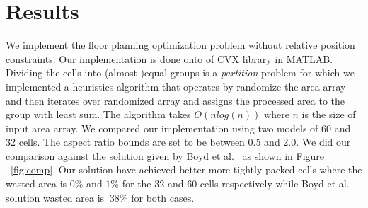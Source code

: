 \documentclass[12pt] {article}
\begin{document}
\section{Results}
We implement the floor planning optimization problem without relative position constraints. Our implementation is done onto of CVX library in MATLAB. Dividing the cells into (almost-)equal groups is a \emph{partition} problem for which we implemented a %
heuristics algorithm that operates by randomize the area array and then iterates over randomized array and assigns the processed area to the group with least sum. The algorithm takes $O(nlog(n))$ where $n$ is the size of input area array. We compared our implementation using two models of 60 and 32 cells. The aspect ratio bounds are set to be between 0.5 and 2.0. We did our comparison against the solution given by Boyd et al.~\citep{boyd2004convex} as shown in Figure ~\ref{fig:comp}. Our solution have achieved better more tightly packed cells where the wasted area is $0\%$ and $1\%$ for the 32 and 60 cells respectively while Boyd et al. solution wasted area is $~38\%$ for both cases. 
\end{document}
